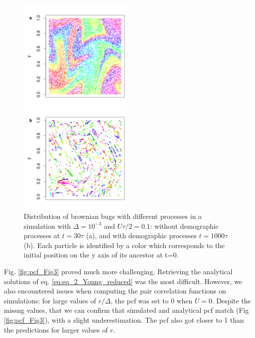 \begin{figure}[H]
\begin{center}
\includegraphics[width=0.49\textwidth]{../code/figure/spatial_distribution_Fig2.png}
  \caption{Distribution of brownian bugs with different processes in a simulation with $\Delta=10^{-3}$ and $U\tau/2=0.1$: without demographic processes at $t=30\tau$ (a), and with demographic processes $t=1000\tau$ (b). Each particle is identified by a color which corresponds to the initial position on the y axis of its ancestor at t=0.}
  \label{fig:spatial_fig2}
\end{center}
  \end{figure}
  
Fig. \ref{fig:pcf_Fig3} proved much more challenging. Retrieving the analytical solutions of eq. \ref{eq:eq_2_Young_reduced} was the most difficult. However, we also encountered issues when computing the pair correlation functions on simulations: for large values of $r/\Delta$, the pcf was set to 0 when $U=0$. Despite the missng values, that we can confirm that simulated and analytical pcf match (Fig \ref{fig:pcf_Fig3}), with a slight underestimation. The pcf also got closer to 1 than the predictions for larger values of $r$. 

